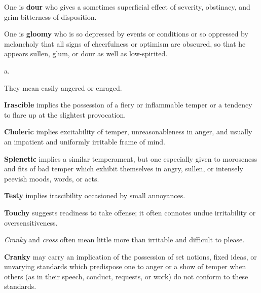 \begin{description}[style=unboxed]
\begin{mynewitemize}
\item One is \textbf{dour} who gives a sometimes superficial effect of severity,
obstinacy, and grim bitterness of disposition.

\item One is \textbf{gloomy} who is so depressed by events or conditions
or so oppressed by melancholy that all signs of cheerfulness or optimism
are obscured, so that he appears sullen, glum, or dour as well as
low-spirited.

\end{mynewitemize}

 a.
\begin{mynewitemize}
\item They mean easily angered or enraged.

\item \textbf{Irascible} implies the possession of a fiery or inflammable temper
or a tendency to flare up at the slightest provocation.

\item \textbf{Choleric} implies excitability of temper, unreasonableness
in anger, and usually an impatient and uniformly irritable frame of mind.

\item \textbf{Splenetic} implies a similar temperament, but one especially 
given to moroseness and fits of bad temper which exhibit themselves in angry,
sullen, or intensely peevish moods, words, or acts.

\item \textbf{Testy} implies irascibility occasioned by small annoyances.

\item \textbf{Touchy} suggests readiness to take offense; it often connotes
undue irritability or oversensitiveness.

\item \textit{Cranky} and \textit{cross} often mean little more than irritable
and difficult to please.

\item \textbf{Cranky} may carry an implication of the possession of set notions, 
fixed ideas, or unvarying standards which predispose one to anger or a show
of temper when others (as in their speech, conduct, requests, or work) do not 
conform to these standards.


\end{mynewitemize}
\end{description}
